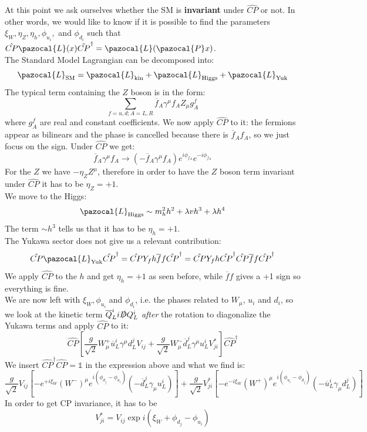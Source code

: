 \documentclass[../main.tex]{subfiles}
\begin{document}
At this point we ask ourselves whether the SM is \textbf{invariant} under $\hat{CP}$ or not. In other words, we would like to know if it is possible to find the parameters $\xi_W, \eta_Z, \eta_h, \phi_{u_i},$ and $\phi_{d_i}$ such that $\hat{CP}\pazocal{L}(x)\hat{CP}^\dagger=\pazocal{L}(\pazocal{P}x)$.\\
The Standard Model Lagrangian can be decomposed into: 
\[
\pazocal{L}_{\text{SM}}=\pazocal{L}_{\text{kin}}+\pazocal{L}_{\text{Higgs}}+\pazocal{L}_{\text{Yuk}}
\]
The typical term containing the $Z$ boson is in the form:
\[
\sum_{f=u,d;A=L,R}\overline{f}_A\gamma^\mu f_AZ_\mu g_A^f
\]
where $g_A^f$ are real and constant coefficients. We now apply $\hat{CP}$ to it: the fermions appear as bilinears and the phase is cancelled because there is $\overline{f}_Af_A$, so we just focus on the sign. Under $\hat{CP}$ we get:
\[
\overline{f}_A\gamma^\mu f_A\xrightarrow[]{}(-\overline{f}_A\gamma^\mu f_A)e^{i\phi_{f_A}}e^{-i\phi_{f_A}}
\]
For the $Z$ we have $-\eta_ZZ^\mu$, therefore in order to have the $Z$ boson term invariant under $\hat{CP}$ it has to be $\eta_Z=+1$.\\
We move to the Higgs: 
\[
\pazocal{L}_{\text{Higgs}}\sim m_h^2h^2+\lambda vh^3+\lambda h^4
\]
The term $\sim h^3$ tells us that it has to be $\eta_h=+1$.\\
The Yukawa sector does not give us a relevant contribution:
\[
\hat{CP}\pazocal{L}_{\text{Yuk}}\hat{CP}^\dagger=\hat{CP}Y_fh\overline{f}f\hat{CP}^\dagger=\hat{CP}Y_fh\hat{CP}^\dagger\hat{CP}\overline{f}f\hat{CP}^\dagger
\]
We apply $\hat{CP}$ to the $h$ and get $\eta_h=+1$ as seen before, while $\overline{f}f$ gives a +1 sign so everything is fine.\\
We are now left with $\xi_W, \phi_{u_i}$ and $\phi_{d_i}$, i.e. the phases related to $W_\mu$, $u_i$ and $d_i$, so we look at the kinetic term $\overline{Q}_L^ii\slashed{D}Q_L^i$ \textit{after} the rotation to diagonalize the Yukawa terms and apply $\hat{CP}$ to it:
\[
\hat{CP}\left[\frac{g}{\sqrt{2}}W_\mu^+\overline{u}_L^i\gamma^\mu d^j_LV_{ij}+\frac{g}{\sqrt{2}}W_\mu^-\overline{d}_L^j\gamma^\mu u_L^iV_{ji}^*\right]\hat{CP}^\dagger
\]
We insert $\hat{CP}^\dagger\hat{CP}=\mathbb{1}$ in the expression above and what we find is:
\[
\frac{g}{\sqrt{2}}V_{ij}\left[-e^{+i\xi_W}(W^-)^\mu e^{i(\phi_{d_j}-\phi_{u_i})}\left(-\overline{d}_L^j\gamma_\mu u_L^i\right)\right]+\frac{g}{\sqrt{2}}V_{ji}^*\left[-e^{-i\xi_W}(W^+)^\mu e^{i(\phi_{u_i}-\phi_{d_j})}\left(-\overline{u}_L^i\gamma_\mu d_L^j\right)\right]
\]
In order to get CP invariance, it has to be 
\[
V_{ji}^*=V_{ij}\exp{i(\xi_W+\phi_{d_j}-\phi_{u_i})}
\]
\end{document}
